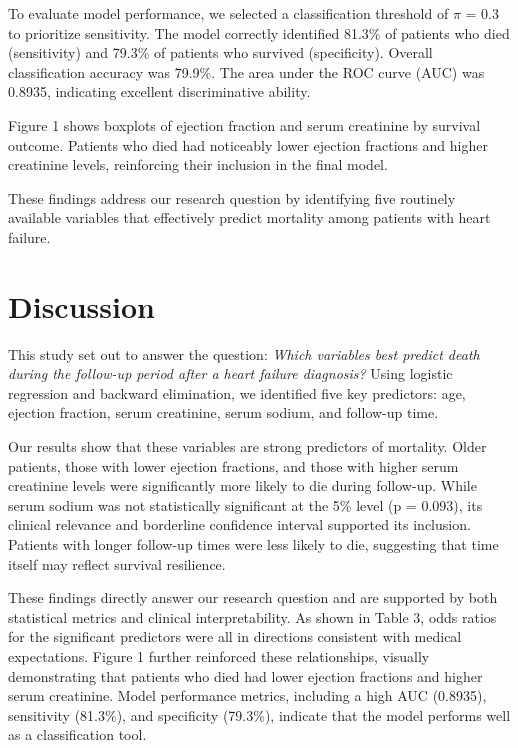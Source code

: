 \documentclass[
  letterpaper,
  DIV=11,
  numbers=noendperiod]{scrartcl}
\begin{document}
To evaluate model performance, we selected a classification threshold of
\(\pi\) = 0.3 to prioritize sensitivity. The model correctly identified
81.3\% of patients who died (sensitivity) and 79.3\% of patients who
survived (specificity). Overall classification accuracy was 79.9\%. The
area under the ROC curve (AUC) was 0.8935, indicating excellent
discriminative ability.

Figure 1 shows boxplots of ejection fraction and serum creatinine by
survival outcome. Patients who died had noticeably lower ejection
fractions and higher creatinine levels, reinforcing their inclusion in
the final model.

These findings address our research question by identifying five
routinely available variables that effectively predict mortality among
patients with heart failure.

\hypertarget{discussion}{%
\section{Discussion}\label{discussion}}

This study set out to answer the question: \emph{Which variables best
predict death during the follow-up period after a heart failure
diagnosis?} Using logistic regression and backward elimination, we
identified five key predictors: age, ejection fraction, serum
creatinine, serum sodium, and follow-up time.

Our results show that these variables are strong predictors of
mortality. Older patients, those with lower ejection fractions, and
those with higher serum creatinine levels were significantly more likely
to die during follow-up. While serum sodium was not statistically
significant at the 5\% level (p = 0.093), its clinical relevance and
borderline confidence interval supported its inclusion. Patients with
longer follow-up times were less likely to die, suggesting that time
itself may reflect survival resilience.

These findings directly answer our research question and are supported
by both statistical metrics and clinical interpretability. As shown in
Table 3, odds ratios for the significant predictors were all in
directions consistent with medical expectations. Figure 1 further
reinforced these relationships, visually demonstrating that patients who
died had lower ejection fractions and higher serum creatinine. Model
performance metrics, including a high AUC (0.8935), sensitivity
(81.3\%), and specificity (79.3\%), indicate that the model performs
well as a classification tool.
\end{document}
